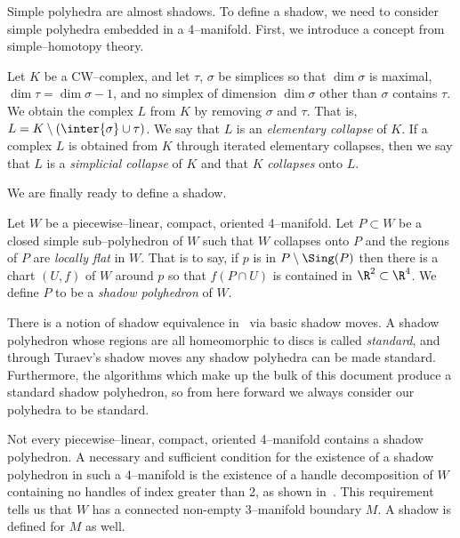 Simple polyhedra are almost shadows.
To define a shadow, we need to consider simple polyhedra embedded in a 4--manifold.
First, we introduce a concept from simple--homotopy theory.

\begin{defn}
  Let $K$ be a CW--complex, and let $\tau$, $\sigma$ be simplices so that $\dim \sigma$ is maximal, $\dim\tau=\dim \sigma -1$, and no simplex of dimension $\dim \sigma$ other than $\sigma$ contains $\tau$.
  We obtain the complex $L$ from $K$ by removing $\sigma$ and $\tau$.
  That is, $L= K\setminus(\inter{\sigma}\cup\tau)$.
  We say that $L$ is an \emph{elementary collapse} of $K$.
  If a complex $L$ is obtained from $K$ through iterated elementary collapses, then we say that $L$ is a \emph{simplicial collapse} of $K$ and that $K$ {\em collapses} onto $L$.   
\end{defn}

We are finally ready to define a shadow.

\begin{defn}
  Let $W$ be a piecewise--linear, compact, oriented 4--manifold.
  Let $P\subset W$ be a closed simple sub--polyhedron of $W$ such that $W$ collapses onto $P$ and the regions of $P$ are \emph{locally flat} in $W$.
  That is to say, if $p$ is in $P\setminus\Sing(P)$ then there is a chart $(U,f)$ of $W$ around $p$ so that $f(P\cap U)$ is contained in $\R^2\subset \R^4$.
  We define $P$ to be a \emph{shadow polyhedron} of $W$.
\end{defn}

\begin{rmk}
  There is a notion of shadow equivalence in~\cite{Turaev91} via basic shadow moves.
  A shadow polyhedron whose regions are all homeomorphic to discs is called \emph{standard}, and through Turaev's shadow moves any shadow polyhedra can be made standard.
  Furthermore, the algorithms which make up the bulk of this document produce a standard shadow polyhedron, so from here forward we always consider our polyhedra to be standard.  
\end{rmk}

Not every piecewise--linear, compact, oriented 4--manifold contains a shadow polyhedron.
A necessary and sufficient condition for the existence of a shadow polyhedron in such a 4--manifold is the existence of a handle decomposition of $W$ containing no handles of index greater than 2, as shown in~\cite{Turaev91}.
This requirement tells us that $W$ has a connected non-empty 3--manifold boundary $M$.
A shadow is defined for $M$ as well.


